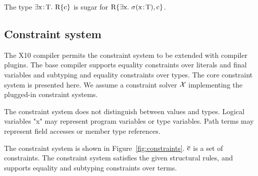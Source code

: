 \documentclass[preprint,nocopyrightspace,9pt]{sigplanconf}
\begin{document}
The type 
$\exty{\Xcd{x}}{\Xcd{T}}{\Xcd{R\{c\}}}$
is sugar for
$\Xcd{R\{}\exc{\Xcd{x}}{\sigma(\Xcd{x}\ty\Xcd{T}),\Xcd{c}}\Xcd{\}}$.

\subsection{
Constraint system
}


The X10 compiler permits the constraint system to be extended
with compiler plugins.  The base compiler supports equality
constraints over literals and final variables and subtyping
and equality
constraints over types.
The core constraint system is presented here.  We assume a
constraint solver ${\cal X}$ implementing the plugged-in
constraint systems.

The constraint system does not distinguish between values and
types.  Logical variables \xcd"x" may represent program variables
or type variables.  Path terms  may represent field
accesses or member type references.

The constraint system is shown in Figure~\ref{fig:constraints}.
$\xbar{c}$ is a set of constraints.  The constraint system
satisfies the given structural rules, and supports equality and
subtyping constraints over terms.
\end{document}
